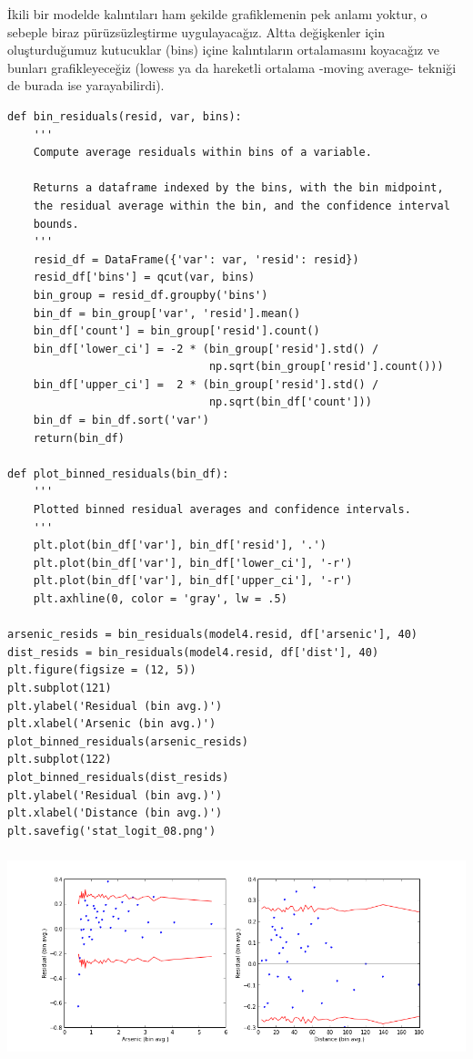 \documentclass[12pt,fleqn]{article}\usepackage{../../common}
\begin{document}
İkili bir modelde kalıntıları ham şekilde grafiklemenin pek anlamı yoktur, o
sebeple biraz pürüzsüzleştirme uygulayacağız. Altta değişkenler için
oluşturduğumuz kutucuklar (bins) içine kalıntıların ortalamasını koyacağız ve
bunları grafikleyeceğiz (lowess ya da hareketli ortalama -moving average-
tekniği de burada ise yarayabilirdi).

\begin{verbatim}
def bin_residuals(resid, var, bins):
    '''
    Compute average residuals within bins of a variable.
    
    Returns a dataframe indexed by the bins, with the bin midpoint,
    the residual average within the bin, and the confidence interval 
    bounds.
    '''
    resid_df = DataFrame({'var': var, 'resid': resid})
    resid_df['bins'] = qcut(var, bins)
    bin_group = resid_df.groupby('bins')
    bin_df = bin_group['var', 'resid'].mean()
    bin_df['count'] = bin_group['resid'].count()
    bin_df['lower_ci'] = -2 * (bin_group['resid'].std() / 
                               np.sqrt(bin_group['resid'].count()))
    bin_df['upper_ci'] =  2 * (bin_group['resid'].std() / 
                               np.sqrt(bin_df['count']))
    bin_df = bin_df.sort('var')
    return(bin_df)

def plot_binned_residuals(bin_df):
    '''
    Plotted binned residual averages and confidence intervals.
    '''
    plt.plot(bin_df['var'], bin_df['resid'], '.')
    plt.plot(bin_df['var'], bin_df['lower_ci'], '-r')
    plt.plot(bin_df['var'], bin_df['upper_ci'], '-r')
    plt.axhline(0, color = 'gray', lw = .5)
    
arsenic_resids = bin_residuals(model4.resid, df['arsenic'], 40)
dist_resids = bin_residuals(model4.resid, df['dist'], 40)
plt.figure(figsize = (12, 5))
plt.subplot(121)
plt.ylabel('Residual (bin avg.)')
plt.xlabel('Arsenic (bin avg.)')
plot_binned_residuals(arsenic_resids)
plt.subplot(122)
plot_binned_residuals(dist_resids)
plt.ylabel('Residual (bin avg.)')
plt.xlabel('Distance (bin avg.)')
plt.savefig('stat_logit_08.png')
\end{verbatim}

\includegraphics[height=6cm]{stat_logit_08.png}
\end{document}
